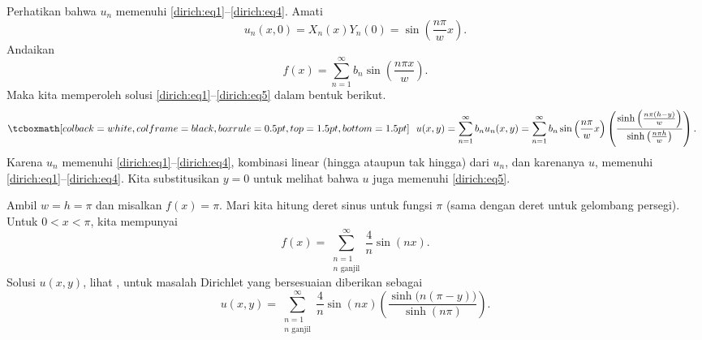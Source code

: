 Perhatikan bahwa $u_n$
memenuhi \eqref{dirich:eq1}--\eqref{dirich:eq4}.
Amati
\begin{equation*}
u_n(x,0) = X_n(x)Y_n(0) = \sin \left( \frac{n \pi}{w} x \right) .
\end{equation*}
Andaikan
\begin{equation*}
f(x) =
\sum_{n=1}^\infty
b_n \sin \left( \frac{n \pi x }{w} \right) .
\end{equation*}
Maka kita memperoleh solusi \eqref{dirich:eq1}--\eqref{dirich:eq5} dalam
bentuk berikut.
\begin{equation*}
\mybxbg{
~~
u(x,y) =
\sum_{n=1}^\infty
b_n u_n(x,y)
=
\sum_{n=1}^\infty
b_n 
\sin \left( \frac{n \pi}{w} x \right)
\left( \frac{\sinh \left( \frac{n \pi (h-y) }{w} \right)}%
{\sinh \left( \frac{n \pi h }{w} \right)} \right)
.
~~
}
\avoidbreak
\end{equation*}
Karena $u_n$ memenuhi \eqref{dirich:eq1}--\eqref{dirich:eq4}, kombinasi linear
(hingga ataupun tak hingga) dari $u_n$, dan karenanya $u$, memenuhi 
\eqref{dirich:eq1}--\eqref{dirich:eq4}. 
Kita substitusikan $y=0$ untuk melihat bahwa $u$
juga memenuhi 
\eqref{dirich:eq5}.

\begin{example}
Ambil $w=h=\pi$ dan misalkan $f(x) = \pi$.  Mari kita hitung deret
sinus untuk fungsi $\pi$ (sama dengan deret untuk gelombang persegi).
Untuk $0 < x < \pi$, kita mempunyai
\begin{equation*}
f(x) =
\sum_{\substack{n=1 \\ n \text{ ganjil}}}^\infty
\frac{4}{n}
\sin (n x) .
\end{equation*}
Solusi $u(x,y)$, lihat ,
untuk masalah Dirichlet yang bersesuaian
diberikan sebagai
\begin{equation*}
u(x,y) =
\sum_{\substack{n=1 \\ n \text{ ganjil}}}^\infty
\frac{4}{n}
\sin (n x)
\left( \frac{\sinh \bigl( n (\pi-y) \bigr) }{\sinh (n \pi)} \right)
.
\end{equation*}

\begin{myfig}
\capstart
{}
\caption{Suhu keadaan tunak suatu pelat persegi, dengan tiga sisi
dipertahankan pada nol dan satu sisi dipertahankan pada $\pi$.\label{dirichsquareplot:fig}}
\end{myfig}
\end{example}

